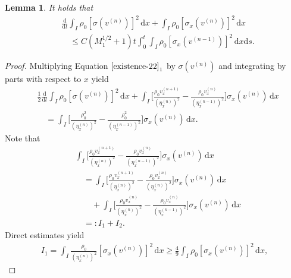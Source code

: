 \documentclass[10pt,a4paper]{amsart}
\newtheorem{lemma}{Lemma}
\newcommand{\diff}{\mathrm{d}}
\begin{document}
\begin{lemma} It holds that
	\begin{equation}\label{existence-23}
		\begin{aligned}
			&\frac{\diff}{\diff t}\int_I\rho_0[\sigma(v^{(n)})]^2\,\diff x
			+\int_I\rho_0[\sigma_x(v^{(n)})]^2\,\diff x\\
			&\quad\leq C(M_1^{1/2}+1)t\int_0^t\int_I\rho_0[\sigma_x(v^{(n-1)})]^2\,\diff x\diff s.
		\end{aligned}
	\end{equation}		
\end{lemma}

\begin{proof} Multiplying Equation \(\eqref{existence-22}_1\) by \(\sigma(v^{(n)})\) and integrating by parts with respect to \(x\) yield
	\begin{equation}\label{existence-24}
		\begin{aligned}
			&\frac{1}{2}\frac{\diff}{\diff t}\int_I\rho_0[\sigma(v^{(n)})]^2\,\diff x
			+\int_I\bigg[\frac{\rho_0v_x^{(n+1)}}{(\eta_x^{(n)})^2}
			-\frac{\rho_0v_x^{(n)}}{(\eta_x^{(n-1)})^2}\bigg]\sigma_x(v^{(n)})\,\diff x\\
			&\quad=\int_I\bigg[\frac{\rho_0^2}{(\eta_x^{(n)})^2}-\frac{\rho_0^2}{(\eta_x^{(n-1)})^2}\bigg]\sigma_x(v^{(n)})\,\diff x.		 
		\end{aligned}
	\end{equation}	
Note that
	\begin{equation}\label{existence-25}
		\begin{aligned}
			&\int_I\bigg[\frac{\rho_0v_x^{(n+1)}}{(\eta_x^{(n)})^2}
			-\frac{\rho_0v_x^{(n)}}{(\eta_x^{(n-1)})^2}\bigg]\sigma_x(v^{(n)})\,\diff x\\
			&\quad=\int_I\bigg[\frac{\rho_0v_x^{(n+1)}}{(\eta_x^{(n)})^2}
			-\frac{\rho_0v_x^{(n)}}{(\eta_x^{(n)})^2}\bigg]\sigma_x(v^{(n)})\,\diff x\\
			&\qquad+\int_I\bigg[\frac{\rho_0v_x^{(n)}}{(\eta_x^{(n)})^2}
			-\frac{\rho_0v_x^{(n)}}{(\eta_x^{(n-1)})^2}\bigg]\sigma_x(v^{(n)})\,\diff x\\ 
			&\quad=\colon I_1+I_2.
		\end{aligned}
	\end{equation}	
Direct estimates yield
\begin{equation}\label{existence-26}
	\begin{aligned}
	I_1=\int_I\frac{\rho_0}{(\eta_x^{(n)})^2}
	[\sigma_x(v^{(n)})]^2\,\diff x\geq \frac{4}{9}\int_I\rho_0[\sigma_x(v^{(n)})]^2\,\diff x,
	\end{aligned}

\end{equation}
\end{proof}
\end{document}
